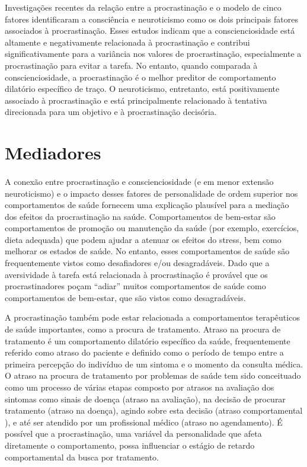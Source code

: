 \documentclass{report}
\begin{document}
Investigações recentes da relação entre a procrastinação e o modelo de cinco fatores identificaram a consciência e neuroticismo como os dois principais fatores associados à procrastinação. Esses estudos indicam que a conscienciosidade está altamente e negativamente relacionada à procrastinação e contribui significativamente para a variância nos valores de procrastinação, especialmente a procrastinação para evitar a tarefa. No entanto, quando comparada à conscienciosidade, a procrastinação é o melhor preditor de comportamento dilatório específico de traço. O neuroticismo, entretanto, está positivamente associado à procrastinação e está principalmente relacionado à tentativa direcionada para um objetivo e à procrastinação decisória.

\section{Mediadores}
\label{chap.mediadores}
\paragraph{}
A conexão entre procrastinação e conscienciosidade (e em menor extensão neuroticismo) e o impacto desses fatores de personalidade de ordem superior nos comportamentos de saúde fornecem uma explicação plausível para a mediação dos efeitos da procrastinação na saúde. Comportamentos de bem-estar são comportamentos de promoção ou manutenção da saúde (por exemplo, exercícios, dieta adequada) que podem ajudar a atenuar os efeitos do stress, bem como melhorar os estados de saúde. No entanto, esses comportamentos de saúde são frequentemente vistos como desafiadores e/ou desagradáveis. Dado que a aversividade à tarefa está relacionada à procrastinação é provável que os procrastinadores poçam “adiar” muitos comportamentos de saúde como comportamentos de bem-estar, que são vistos como desagradáveis.

A procrastinação também pode estar relacionada a comportamentos terapêuticos de saúde importantes, como a procura de tratamento. Atraso na procura de tratamento é um comportamento dilatório específico da saúde, frequentemente referido como atraso do paciente e definido como o período de tempo entre a primeira percepção do indivíduo de um sintoma e o momento da consulta médica. O atraso na procura de tratamento por problemas de saúde tem sido conceituado como um processo de várias etapas composto por atrasos na avaliação dos sintomas como sinais de doença (atraso na avaliação), na decisão de procurar tratamento (atraso na doença), agindo sobre esta decisão (atraso comportamental ), e até ser atendido por um profissional médico (atraso no agendamento). É possível que a procrastinação, uma variável da personalidade que afeta diretamente o comportamento, possa influenciar o estágio de retardo comportamental da busca por tratamento.
\end{document}
